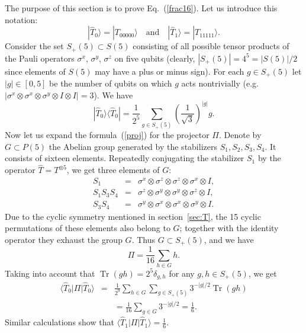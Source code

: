 \documentclass[pra,twocolumn,showpacs]{revtex4}
\newcommand{\la}{\langle}
\newcommand{\ra}{\rangle}
\newcommand{\sx}{\sigma^x}
\newcommand{\sy}{\sigma^y}
\newcommand{\sz}{\sigma^z}
\newcommand{\nn}{\nonumber}
\DeclareMathOperator*{\tr}{\mathop{\mathrm{Tr}}}
\begin{document}
\section{}
The purpose of this section is to prove Eq.~(\ref{frac16}).
Let us introduce this notation:
\[
|\hat{T}_0\ra=|T_{00000}\ra\quad \text{and} \quad
|\hat{T}_1\ra=|T_{11111}\ra.
\]
Consider the set $S_+(5)\subset S(5)$ consisting of all possible tensor
products of the Pauli operators $\sx$, $\sy$, $\sz$ on five qubits (clearly,
$|S_+(5)|=4^5=|S(5)|/2$ since elements of $S(5)$ may have a plus or minus
sign). For each $g\in S_+(5)$ let $|g|\in [0,5]$ be the number of qubits on
which $g$ acts nontrivially (e.g. $|\sx\otimes\sx\otimes\sy\otimes I\otimes
I|=3$).  We have
\[
|\hat{T}_{0}\ra\la \hat{T}_{0}|=\frac1{2^5}
\sum_{g\in S_+(5)} \left(\frac1{\sqrt{3}}\right)^{|g|} g.
\]
Now let us expand the formula~(\ref{proj}) for the projector $\Pi$.  Denote by
$G\subset P(5)$ the Abelian group generated by the stabilizers $S_1, S_2, S_3,
S_4$.  It consists of sixteen elements.  Repeatedly conjugating the stabilizer $S_1$ by
the operator $\hat{T}=T^{\otimes 5}$, we get three elements of $G$:
\begin{eqnarray}
S_1 &=& \sx\otimes\sz\otimes\sz\otimes\sx\otimes I,\nn \\
S_1 S_3 S_4 &=& \sz\otimes\sy\otimes\sy\otimes\sz\otimes I,\nn \\
S_3 S_4 &=& \sy\otimes\sx\otimes\sx\otimes\sy\otimes I. \nn
\end{eqnarray}
Due to the cyclic symmetry mentioned in section~\ref{sec:T}, the 15 cyclic
permutations of these elements also belong to $G$; together with the identity
operator they exhaust the group $G$. Thus $G\subset S_+(5)$, and we have
\[
\Pi = \frac1{16} \sum_{h\in G} h.
\]
Taking into account that $\tr(gh)=2^5 \delta_{g,h}$ for any
$g,h\in S_+(5)$, we get
\begin{eqnarray}
\la\hat{T}_{0}|\Pi|\hat{T}_{0}\ra &=&
\frac1{2^9}\sum_{h\in G} \sum_{g\in S_+(5)} 
3^{-|g|/2} \tr{(gh)} \nn \\
&& {}
= \frac1{16} \sum_{g\in G} 3^{-|g|/2} =
\frac16.\nn
\end{eqnarray}
Similar calculations show that
$\la\hat{T}_{1}|\Pi|\hat{T}_{1}\ra=\frac{1}{6}$.
\end{document}
